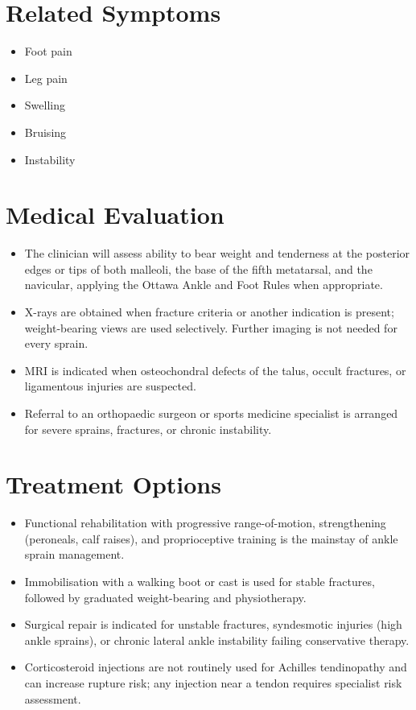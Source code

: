 \section*{Related Symptoms}
\begin{itemize}
 \item Foot pain
 \item Leg pain
 \item Swelling
 \item Bruising
 \item Instability
\end{itemize}


\section*{Medical Evaluation}
\begin{itemize}
 \item The clinician will assess ability to bear weight and tenderness at the posterior edges or tips of both malleoli, the base of the fifth metatarsal, and the navicular, applying the Ottawa Ankle and Foot Rules when appropriate.
 \item X-rays are obtained when fracture criteria or another indication is present; weight-bearing views are used selectively. Further imaging is not needed for every sprain.
 \item MRI is indicated when osteochondral defects of the talus, occult fractures, or ligamentous injuries are suspected.
 \item Referral to an orthopaedic surgeon or sports medicine specialist is arranged for severe sprains, fractures, or chronic instability.
\end{itemize}

\section*{Treatment Options}
\begin{itemize}
 \item Functional rehabilitation with progressive range-of-motion, strengthening (peroneals, calf raises), and proprioceptive training is the mainstay of ankle sprain management.
 \item Immobilisation with a walking boot or cast is used for stable fractures, followed by graduated weight-bearing and physiotherapy.
 \item Surgical repair is indicated for unstable fractures, syndesmotic injuries (high ankle sprains), or chronic lateral ankle instability failing conservative therapy.
 \item Corticosteroid injections are not routinely used for Achilles tendinopathy and can increase rupture risk; any injection near a tendon requires specialist risk assessment.
\end{itemize}

